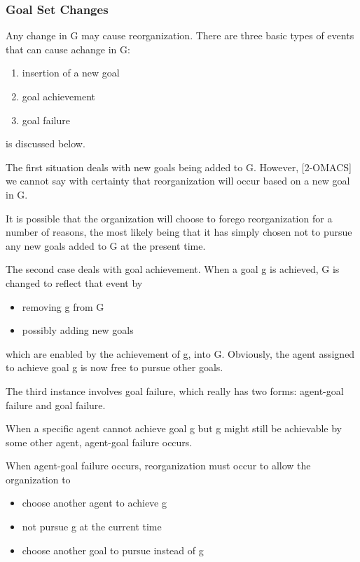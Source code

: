 \subsubsection{ Goal Set Changes }
Any change in G may cause reorganization. There are three basic types 
of events that can cause achange in G: 
\begin{enumerate}
\item   insertion of a new goal  
\item   goal achievement 
\item   goal failure
\end{enumerate}

is discussed below. 

The first situation deals with new goals being added to G. However, [2-OMACS]
we cannot say with certainty that reorganization will occur based on a new goal in G. 

It is possible that the organization will choose to forego reorganization for a number of reasons, the most likely being that it has simply chosen not to pursue any new goals added to G at the present time.

The second case deals with goal achievement. When a goal g is achieved, G is changed to reflect that event by 

\begin{itemize}
\item  removing g from G
\item  possibly adding new goals
\end{itemize}	

 which are enabled by the achievement of g, into G. Obviously, the agent assigned to achieve goal g is now free to pursue other goals. 

The third instance involves goal failure, which really has two forms: agent-goal failure and goal failure.

When a specific agent cannot achieve goal g but g might still be achievable by some other agent, 
agent-goal failure occurs. 

When agent-goal failure occurs, reorganization must occur to allow the organization to 

\begin{itemize}
\item  choose another agent to achieve g
\item  not pursue g at the current time
\item  choose another goal to pursue instead of g
\end{itemize}	
 
